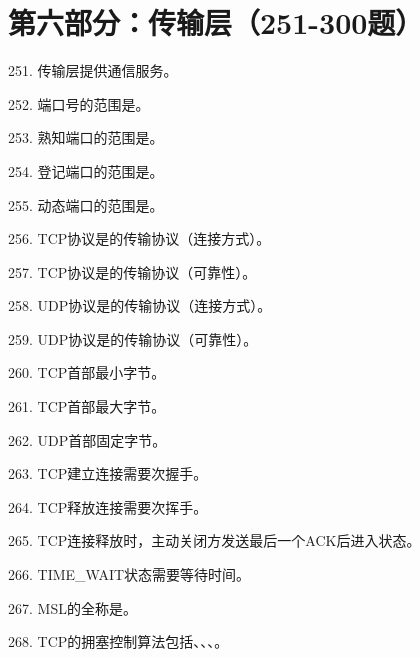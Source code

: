 \section{第六部分：传输层（251-300题）}

251. 传输层提供\underline{\hspace{2cm}}通信服务。

252. 端口号的范围是\underline{\hspace{2cm}}。

253. 熟知端口的范围是\underline{\hspace{2cm}}。

254. 登记端口的范围是\underline{\hspace{2cm}}。

255. 动态端口的范围是\underline{\hspace{2cm}}。

256. TCP协议是\underline{\hspace{2cm}}的传输协议（连接方式）。

257. TCP协议是\underline{\hspace{2cm}}的传输协议（可靠性）。

258. UDP协议是\underline{\hspace{2cm}}的传输协议（连接方式）。

259. UDP协议是\underline{\hspace{2cm}}的传输协议（可靠性）。

260. TCP首部最小\underline{\hspace{2cm}}字节。

261. TCP首部最大\underline{\hspace{2cm}}字节。

262. UDP首部固定\underline{\hspace{2cm}}字节。

263. TCP建立连接需要\underline{\hspace{2cm}}次握手。

264. TCP释放连接需要\underline{\hspace{2cm}}次挥手。

265. TCP连接释放时，主动关闭方发送最后一个ACK后进入\underline{\hspace{2cm}}状态。

266. TIME\_WAIT状态需要等待\underline{\hspace{2cm}}时间。

267. MSL的全称是\underline{\hspace{4cm}}。

268. TCP的拥塞控制算法包括\underline{\hspace{2cm}}、\underline{\hspace{2cm}}、\underline{\hspace{2cm}}、\underline{\hspace{2cm}}。

